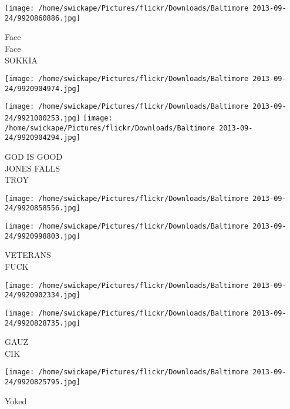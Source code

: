\documentclass[10pt,letterpaper]{article}
\begin{document}
\texttt{[image: /home/swickape/Pictures/flickr/Downloads/Baltimore 2013-09-24/9920860886.jpg]}

Face\\
Face\\
SOKKIA
\pagebreak

\texttt{[image: /home/swickape/Pictures/flickr/Downloads/Baltimore 2013-09-24/9920904974.jpg]}

\vspace{0.25in}
\texttt{[image: /home/swickape/Pictures/flickr/Downloads/Baltimore 2013-09-24/9921000253.jpg]}
\texttt{[image: /home/swickape/Pictures/flickr/Downloads/Baltimore 2013-09-24/9920904294.jpg]}

GOD IS GOOD\\
JONES FALLS\\
TROY
\pagebreak

\texttt{[image: /home/swickape/Pictures/flickr/Downloads/Baltimore 2013-09-24/9920858556.jpg]}

\vspace{0.25in}
\texttt{[image: /home/swickape/Pictures/flickr/Downloads/Baltimore 2013-09-24/9920998803.jpg]}

VETERANS\\
FUCK
\pagebreak

\texttt{[image: /home/swickape/Pictures/flickr/Downloads/Baltimore 2013-09-24/9920902334.jpg]}

\vspace{0.25in}
\texttt{[image: /home/swickape/Pictures/flickr/Downloads/Baltimore 2013-09-24/9920828735.jpg]}

GAUZ\\
CIK
\pagebreak

\texttt{[image: /home/swickape/Pictures/flickr/Downloads/Baltimore 2013-09-24/9920825795.jpg]}

Yoked
\pagebreak
\end{document}
